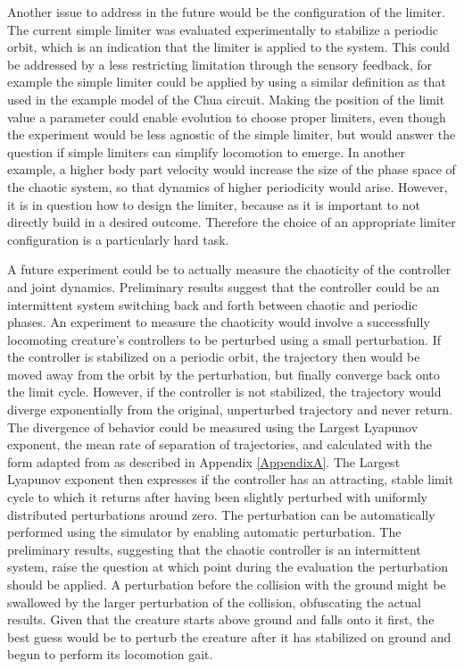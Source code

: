 \documentclass[main]{subfiles}
\begin{document}
Another issue to address in the future would be the configuration of the limiter. %
%
The current simple limiter was evaluated experimentally to stabilize a periodic orbit, which is an indication that the limiter is applied to the system. %
%
This could be addressed by a less restricting limitation through the sensory feedback, for example the simple limiter could be applied by using a similar definition as that used in the example model of the Chua circuit. %
%
Making the position of the limit value a parameter could enable evolution to choose proper limiters, even though the experiment would be less agnostic of the simple limiter, but would answer the question if simple limiters can simplify locomotion to emerge. %
%
In another example, a higher body part velocity would increase the size of the phase space of the chaotic system, so that dynamics of higher periodicity would arise. %
%
However, it is in question how to design the limiter, because as it is important to not directly build in a desired outcome. %
%
Therefore the choice of an appropriate limiter configuration is a particularly hard task.

A future experiment could be to actually measure the chaoticity of the controller and joint dynamics. %
%
Preliminary results suggest that the controller could be an intermittent system switching back and forth between chaotic and periodic phases. %
%
An experiment to measure the chaoticity would involve a successfully locomoting creature's controllers to be perturbed using a small perturbation. %
%
If the controller is stabilized on a periodic orbit, the trajectory then would be moved away from the orbit by the perturbation, but finally converge back onto the limit cycle. %
%
However, if the controller is not stabilized, the trajectory would diverge exponentially from the original, unperturbed trajectory and never return. %
%
The divergence of behavior could be measured using the Largest Lyapunov exponent, the mean rate of separation of trajectories, and calculated with the form adapted from \cite{bib:Rosenstein1993} as described in Appendix \ref{AppendixA}. %
%
The Largest Lyapunov exponent then expresses if the controller has an attracting, stable limit cycle to which it returns after having been slightly perturbed with uniformly distributed perturbations around zero. %
%
The perturbation can be automatically performed using the simulator by enabling automatic perturbation. %
%
The preliminary results, suggesting that the chaotic controller is an intermittent system, raise the question at which point during the evaluation the perturbation should be applied. %
%
A perturbation before the collision with the ground might be swallowed by the larger perturbation of the collision, obfuscating the actual results. %
%
Given that the creature starts above ground and falls onto it first, the best guess would be to perturb the creature after it has stabilized on ground and begun to perform its locomotion gait. 
\end{document}
